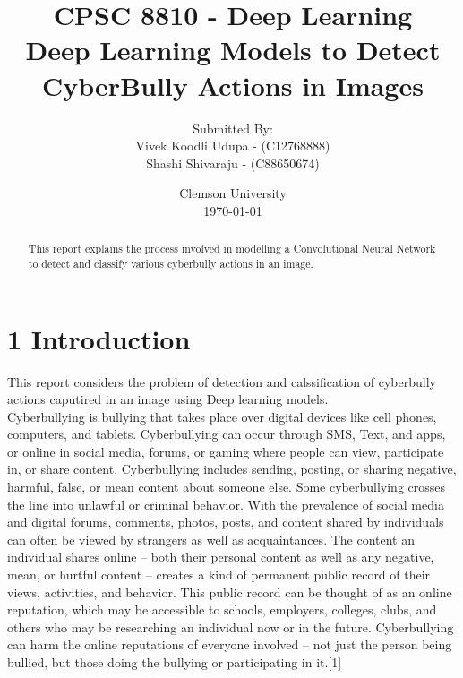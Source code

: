 \documentclass[12pt]{report}
\title{\bf CPSC 8810 - Deep Learning\\
Deep Learning Models to Detect CyberBully Actions in Images}
\author{Submitted By:\\	Vivek Koodli Udupa - (C12768888) \\
		Shashi Shivaraju - (C88650674)\\}
\date{Clemson University \\\today}
\begin{document}
\maketitle
{}%



\newpage
\begin{abstract}
\thispagestyle{plain}
This report explains the process involved in modelling a Convolutional Neural Network to detect and classify various cyberbully actions in an image. 
\end{abstract}
\newpage

\section*{1 Introduction}
This report considers the problem of detection and calssification of cyberbully actions caputired in an image using Deep learning models.  \\

Cyberbullying is bullying that takes place over digital devices like cell phones, computers, and tablets. Cyberbullying can occur through SMS, Text, and apps, or online in social media, forums, or gaming where people can view, participate in, or share content. Cyberbullying includes sending, posting, or sharing negative, harmful, false, or mean content about someone else. Some cyberbullying crosses the line into unlawful or criminal behavior. With the prevalence of social media and digital forums, comments, photos, posts, and content shared by individuals can often be viewed by strangers as well as acquaintances. The content an individual shares online – both their personal content as well as any negative, mean, or hurtful content – creates a kind of permanent public record of their views, activities, and behavior. This public record can be thought of as an online reputation, which may be accessible to schools, employers, colleges, clubs, and others who may be researching an individual now or in the future. Cyberbullying can harm the online reputations of everyone involved – not just the person being bullied, but those doing the bullying or participating in it.[1] \\ 
\end{document}
